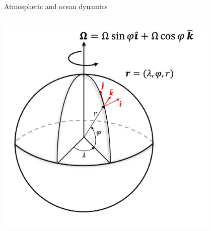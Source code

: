 \documentclass[aspectratio=169,xcolor=dvipsnames]{beamer}
\begin{document}
\begin{frame}[t]{Atmospheric and ocean dynamics}
\begin{columns}
\begin{column}[t]{0.4\textwidth}
\begin{center}
        \includegraphics[width=0.8\textwidth]{figs/Fig-SphericalCoordRotating.png}
         \end{center}         
    \end{column}
\end{columns}

\end{frame}
\end{document}
